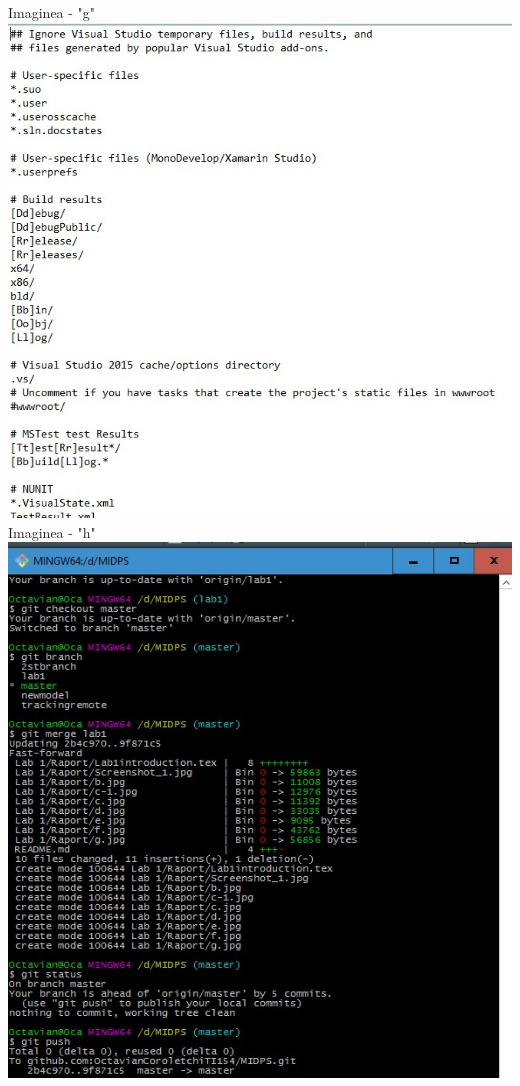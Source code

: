 \begin{center}
Imaginea - "g" \\
\vspace{10 mm}
\includegraphics[scale=1]{h} \\
Imaginea - "h" \\
\vspace{10 mm}
\includegraphics[scale=0.9]{i} \\ 

\end{center}
